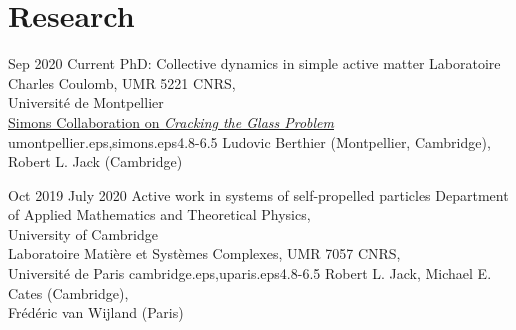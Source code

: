 \documentclass[letterpaper]{cvtemplate_en} %
\begin{document}
\makeprofile %


\vspace{\parskip}
\section{Research}

\begin{cvbody}

\cvitem
	{Sep 2020}
	{Current}
  {PhD: Collective dynamics in simple active matter}
  {Laboratoire Charles Coulomb, UMR 5221 CNRS,\\ Universit\'e de Montpellier \\
  \href{https://scglass.uchicago.edu}{Simons Collaboration on \textit{Cracking the Glass Problem}}}
  {umontpellier.eps,simons.eps}{4.8}{-6.5}
	{Ludovic Berthier (Montpellier, Cambridge),\\ Robert L. Jack (Cambridge)}
  {\\}

\cvitem
	{Oct 2019}
	{July 2020}
  {Active work in systems of self-propelled particles}
  {Department of Applied Mathematics and Theoretical Physics,\\ University of Cambridge \\
	Laboratoire Mati\`ere et Syst\`emes Complexes, UMR 7057 CNRS,\\ Universit\'e de Paris }
  {cambridge.eps,uparis.eps}{4.8}{-6.5}
	{Robert L. Jack, Michael E. Cates (Cambridge),\\ Fr\'ed\'eric van Wijland (Paris)}
  {\\}


\end{cvbody}
\end{document}
